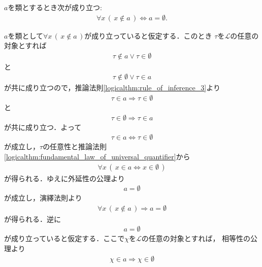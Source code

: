 	\begin{screen}
		\begin{thm}
		\label{thm:uniqueness_of_emptyset}
			$a$を類とするとき次が成り立つ:
			\begin{align}
				\forall x\, (\, x \notin a\, ) \Longleftrightarrow a = \emptyset.
			\end{align}
		\end{thm}
	\end{screen}
	
	\begin{prf}
		$a$を類として$\forall x\, (\, x \notin a\, )$が成り立っていると仮定する．このとき
		$\tau$を$\mathcal{L}$の任意の対象とすれば
		\begin{align}
			\tau \notin a \vee \tau \in \emptyset
		\end{align}
		と
		\begin{align}
			\tau \notin \emptyset \vee \tau \in a
		\end{align}
		が共に成り立つので，推論法則\ref{logicalthm:rule_of_inference_3}より
		\begin{align}
			\tau \in a \Longrightarrow \tau \in \emptyset
		\end{align}
		と
		\begin{align}
			\tau \in \emptyset \Longrightarrow \tau \in a
		\end{align}
		が共に成り立つ．よって
		\begin{align}
			\tau \in a \Longleftrightarrow \tau \in \emptyset
		\end{align}
		が成立し，$\tau$の任意性と推論法則\ref{logicalthm:fundamental_law_of_universal_quantifier}から
		\begin{align}
			\forall x\, (\, x \in a \Longleftrightarrow x \in \emptyset\, )
		\end{align}
		が得られる．ゆえに外延性の公理より
		\begin{align}
			a = \emptyset
		\end{align}
		が成立し，演繹法則より
		\begin{align}
			\forall x\, (\, x \notin a\, ) \Longrightarrow a = \emptyset
		\end{align}
		が得られる．逆に
		\begin{align}
			a = \emptyset
		\end{align}
		が成り立っていると仮定する．ここで$\chi$を$\mathcal{L}$の任意の対象とすれば，
		相等性の公理より
		\begin{align}
			\chi \in a \Longrightarrow \chi \in \emptyset

\end{align}
\end{prf}
